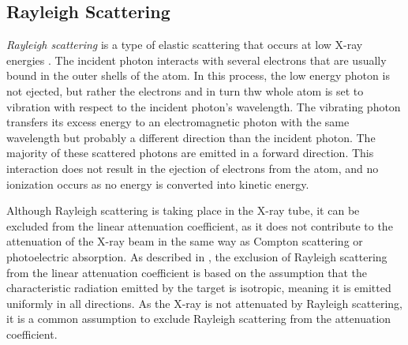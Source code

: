 \subsection{Rayleigh Scattering}
\emph{Rayleigh scattering} is a type of elastic scattering that occurs at low X-ray energies \cite[Chap. 7]{medicalImagingSystemsIntro2019:}. The incident photon interacts with several electrons that are
usually bound in the outer shells of the atom. In this process, the low energy photon is not ejected, but rather the electrons and in turn thw whole atom is
set to vibration with respect to the incident photon’s wavelength. The vibrating photon transfers its excess energy to an electromagnetic photon with the same wavelength but probably a different direction than the incident photon. The majority of these scattered photons are emitted in a forward direction. This interaction does not result in the ejection of electrons from the atom, and no ionization occurs as no energy is converted into kinetic energy.

Although Rayleigh scattering is taking place in the X-ray tube, it can be 
excluded from the linear attenuation coefficient, as it does not contribute to
the attenuation of the X-ray beam in the same way as Compton scattering or
photoelectric absorption. As described in \cite{poludniowski2022calculating}, the exclusion of Rayleigh scattering from the linear attenuation coefficient is based on the assumption that the characteristic radiation emitted by the target is isotropic, meaning it is emitted uniformly in all directions. As the X-ray is not attenuated by Rayleigh scattering, it is a common assumption to exclude Rayleigh scattering from the attenuation coefficient.
